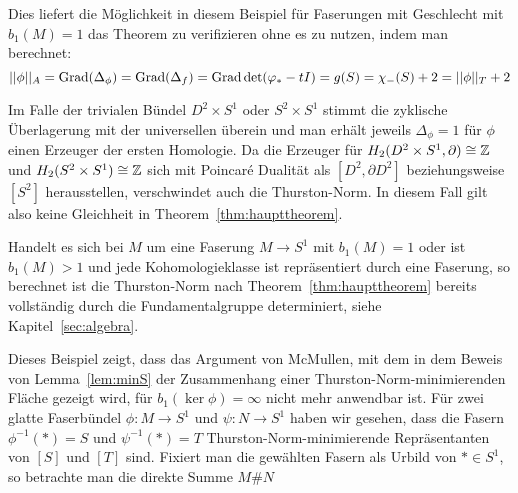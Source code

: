 \begin{bsp}
        Dies liefert die Möglichkeit in diesem Beispiel für Faserungen mit Geschlecht mit $b_1(M)=1$ das Theorem zu verifizieren ohne es zu nutzen, indem man berechnet: 
        \[
            ||\phi||_A=\operatorname{Grad}(\Delta_\phi)=\operatorname{Grad} (\Delta_f) = \operatorname{Grad} \det (\varphi_*-tI) = g(S) = \chi_-(S) +2 = ||\phi||_T+2
        \]

        Im Falle der trivialen Bündel $D^2\times S^1$ oder $S^2\times S^1$ stimmt die zyklische Überlagerung mit der universellen überein und man erhält jeweils $\Delta_\phi =1$ für $\phi$ einen Erzeuger der ersten Homologie. Da die Erzeuger für $H_2(D^2 \times S^1, \partial)\cong \mathbb{Z}$ und $H_2(S^2\times S^1) \cong \mathbb{Z}$ sich mit Poincaré Dualität als $[D^2,\partial D^2]$ beziehungsweise $[S^2]$ herausstellen, verschwindet auch die Thurston-Norm. In diesem Fall gilt also keine Gleichheit in Theorem~\ref{thm:haupttheorem}. 

    \end{bsp}

    \begin{bsp}
        Handelt es sich bei $M$ um eine Faserung $M\to S^1$ mit $b_1(M)=1$ oder ist $b_1(M)>1$ und jede Kohomologieklasse ist repräsentiert durch eine Faserung, so berechnet ist die Thurston-Norm nach Theorem~\ref{thm:haupttheorem} bereits vollständig durch die Fundamentalgruppe determiniert, siehe Kapitel~\ref{sec:algebra}.
    \end{bsp}

    \begin{bsp}
    \label{bsp:unzusammenhgds}
    Dieses Beispiel zeigt, dass das Argument von McMullen, mit dem in dem Beweis von Lemma~\ref{lem:minS} der Zusammenhang einer Thurston-Norm-minimierenden Fläche gezeigt wird, für $b_1(\ker\phi)=\infty$ nicht mehr anwendbar ist. Für zwei glatte Faserbündel $\phi:M \to S^1$ und $\psi: N\to S^1$ haben wir gesehen, dass die Fasern $\phi^{-1}(*)=S$ und $\psi^{-1}(*)=T$ Thurston-Norm-minimierende Repräsentanten von $[S]$ und $[T]$ sind. Fixiert man die gewählten Fasern als Urbild von $*\in S^1$, so betrachte man die direkte Summe $M\#N$
\end{bsp}


